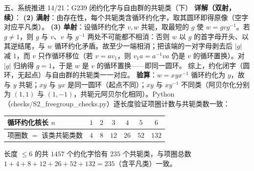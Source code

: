 \documentclass[aspectratio=169,10pt,fontset=none]{ctexbeamer}
\newcommand{\key}[1]{\textcolor{ink}{\bfseries #1}}
\begin{document}
\begin{frame}[t]{五、系统推进 14/21：G239 闭约化字与自由群的共轭类（下）}
\scriptsize
\key{详解（双射，续）}：
\textbf{(2) 满射}：由存在性，每个共轭类含循环约化字，取其圆环即得原像（空字对应平凡类）。
\textbf{(3) 单射}：设循环约化字 $v,w$ 共轭，取最短的 $g$ 使 $w=gvg^{-1}$。若 $g\ne1$，则 $g$ 与 $v$、$v$ 与 $g^{-1}$ 两处不可能都不相消：否则 $w$ 以 $g$ 的首字母开头、以其逆结尾，与 $w$ 循环约化矛盾。故至少一端相消；把该端的一对字母剥去后 $|g|$ 减 $1$，而 $v$ 只作循环移位（若 $v=av_1$，则 $v_1a=a^{-1}va$ 仍是 $v$ 的循环置换）。对 $|g|$ 归纳得 $g=1$，于是 $w$ 是 $v$ 的循环置换——即同一圆环。
综上，约化闭字（圆环，无起点）与自由群的共轭类一一对应。
\key{验算}：$w=xyx^{-1}$ 循环约化为 $y$，故与 $y$ 共轭；$xy$ 与 $yx$ 是同一圆环（起点不同）；$xy$ 与 $xy^{-1}$ 不同类（阿贝尔化分别为 $(1,1)$ 与 $(1,-1)$，共轭元阿贝尔化相同）。Python（\textsf{checks/S2\_freegroup\_checks.py}）逐长度验证项圈计数与共轭类数一致：
\begin{center}
\begin{tabular}{@{}lcccccc@{}}
\toprule
循环约化核长 $n$ & $1$ & $2$ & $3$ & $4$ & $5$ & $6$\\
\midrule
项圈数 $=$ 该类共轭类数 & $4$ & $8$ & $12$ & $26$ & $52$ & $132$\\
\bottomrule
\end{tabular}
\end{center}
长度 $\le6$ 的共 $1457$ 个约化字恰有 $235$ 个共轭类，与项圈总数 $1+4+8+12+26+52+132=235$（含平凡类）一致。
\end{frame}

\end{document}
